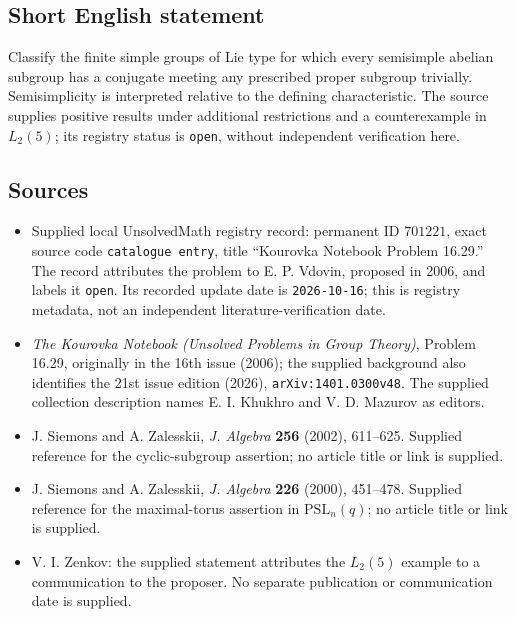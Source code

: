 \documentclass[11pt]{article}
\begin{document}
\subsection{Short English statement}
Classify the finite simple groups of Lie type for which every semisimple abelian subgroup has a conjugate meeting any prescribed proper subgroup trivially. Semisimplicity is interpreted relative to the defining characteristic. The source supplies positive results under additional restrictions and a counterexample in \(L_2(5)\); its registry status is \texttt{open}, without independent verification here.
\subsection{Sources}
\begin{itemize}
\item Supplied local UnsolvedMath registry record: permanent ID \(701221\), exact source code \texttt{catalogue entry}, title ``Kourovka Notebook Problem 16.29.'' The record attributes the problem to E. P. Vdovin, proposed in 2006, and labels it \texttt{open}. Its recorded update date is \texttt{2026-10-16}; this is registry metadata, not an independent literature-verification date.
\item \emph{The Kourovka Notebook (Unsolved Problems in Group Theory)}, Problem 16.29, originally in the 16th issue (2006); the supplied background also identifies the 21st issue edition (2026), \texttt{arXiv:1401.0300v48}. The supplied collection description names E. I. Khukhro and V. D. Mazurov as editors.
\item J. Siemons and A. Zalesskii, \emph{J. Algebra} \textbf{256} (2002), 611--625. Supplied reference for the cyclic-subgroup assertion; no article title or link is supplied.
\item J. Siemons and A. Zalesskii, \emph{J. Algebra} \textbf{226} (2000), 451--478. Supplied reference for the maximal-torus assertion in \(\mathrm{PSL}_n(q)\); no article title or link is supplied.
\item V. I. Zenkov: the supplied statement attributes the \(L_2(5)\) example to a communication to the proposer. No separate publication or communication date is supplied.
\end{itemize}
\end{document}
